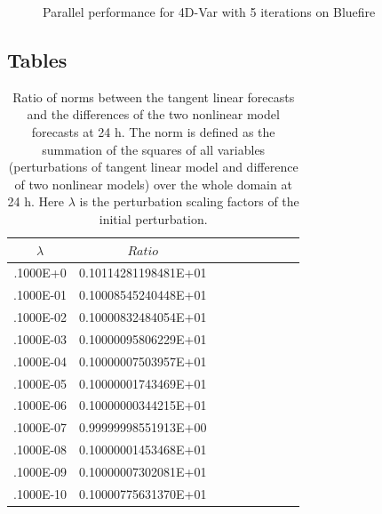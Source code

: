 \documentclass[12pt]{article}
\begin{document}
\begin{figure}[t]
     \begin{center}
%
%
    \end{center}
    \caption{%
        Parallel performance for 4D-Var with 5 iterations on Bluefire
     }%
   \label{fig:4dvar}
\end{figure}


\subsection{Tables}
\begin{table}[t]
\caption{Ratio of norms between the tangent linear forecasts and the differences of the two nonlinear model forecasts at 24 h. The norm is defined as the summation of the squares of all variables (perturbations of tangent linear model and difference of two nonlinear models) over the whole domain at 24 h. Here $\lambda$ is the perturbation scaling factors of the initial perturbation.}\label{tlcheck}
\begin{center}
\begin{tabular}{cccccrcrc}
\hline\hline
$\lambda$ & $Ratio$ \\
\hline
.1000E+0 & 0.10114281198481E+01 \\
.1000E-01  & 0.10008545240448E+01 \\
.1000E-02  &  0.10000832484054E+01 \\
.1000E-03  &  0.10000095806229E+01 \\
.1000E-04  &  0.10000007503957E+01 \\
.1000E-05  &  0.10000001743469E+01 \\
.1000E-06  &  0.10000000344215E+01 \\
.1000E-07  &  0.99999998551913E+00 \\
.1000E-08  &  0.10000001453468E+01 \\
.1000E-09  &  0.10000007302081E+01 \\
.1000E-10  &  0.10000775631370E+01 \\
\hline
\end{tabular}
\end{center}
\end{table}
\end{document}
